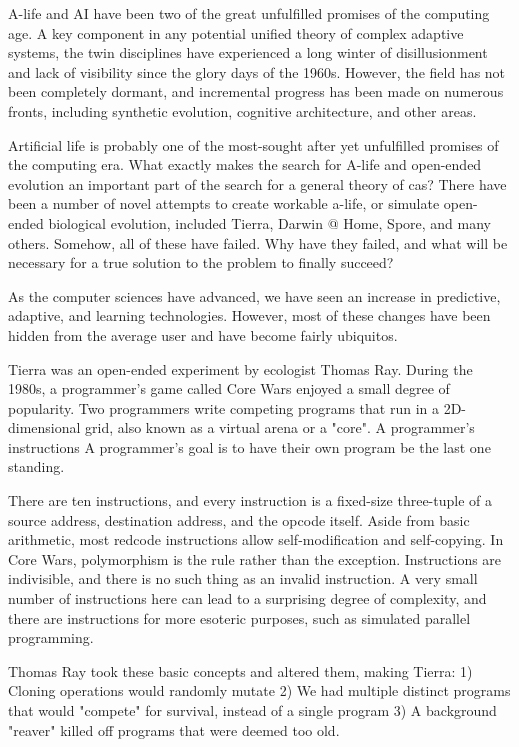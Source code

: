 A-life and AI have been two of the great unfulfilled promises of the computing age. A key component in any potential unified theory of complex adaptive systems, the twin disciplines have experienced a long winter of disillusionment and lack of visibility since the glory days of the 1960s. However, the field has not been completely dormant, and incremental progress has been made on numerous fronts, including synthetic evolution, cognitive architecture, and other areas.

Artificial life is probably one of the most-sought after yet unfulfilled
promises of the computing era. What exactly makes the search for A-life and
open-ended evolution an important part of the search for a general theory
of cas? There have been a number of novel attempts to create  workable
a-life, or simulate open-ended biological evolution, included Tierra,
Darwin @ Home, Spore, and many others. Somehow, all of these have failed.
Why have they failed, and what will be necessary for a true solution to the
problem to finally succeed?



As the computer sciences have advanced, we have seen an increase in predictive, adaptive, and learning technologies. However, most of these changes have been hidden from the average user and have become fairly ubiquitos.


Tierra was an open-ended experiment by ecologist Thomas Ray. During the 1980s, a programmer's game called Core Wars enjoyed a small degree of popularity. Two programmers write competing programs that run in a 2D-dimensional grid, also known as a virtual arena or a "core". A programmer's instructions A programmer's goal is to have their own program be the last one standing.

There are ten instructions, and every instruction is a fixed-size three-tuple of a source address, destination address, and the opcode itself. Aside from basic arithmetic, most redcode instructions allow self-modification and self-copying. In Core Wars, polymorphism is the rule rather than the exception. Instructions are indivisible, and there is no such thing as an invalid instruction. A very small number of instructions here can lead to a surprising degree of complexity, and there are instructions for more esoteric purposes, such as simulated parallel programming.

Thomas Ray took these basic concepts and altered them, making Tierra:
	1) Cloning operations would randomly mutate
	2) We had multiple distinct programs that would "compete" for survival, instead of a single program
	3) A background "reaver" killed off programs that were deemed too old.
	
